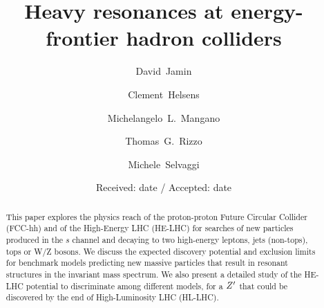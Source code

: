 \documentclass[pdftex,twocolumn,epjc3]{svjour3}          %
\begin{document}
\title{\boldmath Heavy resonances at energy-frontier hadron colliders}



\author{David~Jamin
        \and
        Clement~Helsens
        \and
        Michelangelo~L.~Mangano
        \and
        Thomas~G.~Rizzo
        \and
        Michele~Selvaggi
}



\date{Received: date / Accepted: date}


\maketitle

\begin{abstract}
This paper explores the physics reach of the proton-proton Future Circular Collider (FCC-hh) and of the High-Energy LHC (HE-LHC) for searches of new particles produced in the $s$ channel and decaying to two high-energy leptons, jets (non-tops), tops or W/Z bosons. We discuss the expected discovery potential and exclusion limits for benchmark models predicting new massive particles that result in resonant structures in the invariant mass spectrum. We also present a detailed study of the HE-LHC potential to discriminate among different models, for a $Z^{\prime}$ that could be discovered by the end of High-Luminosity LHC (HL-LHC).
\end{abstract}



\begin{thebibliography}{9}

\end{thebibliography}
\end{document}
